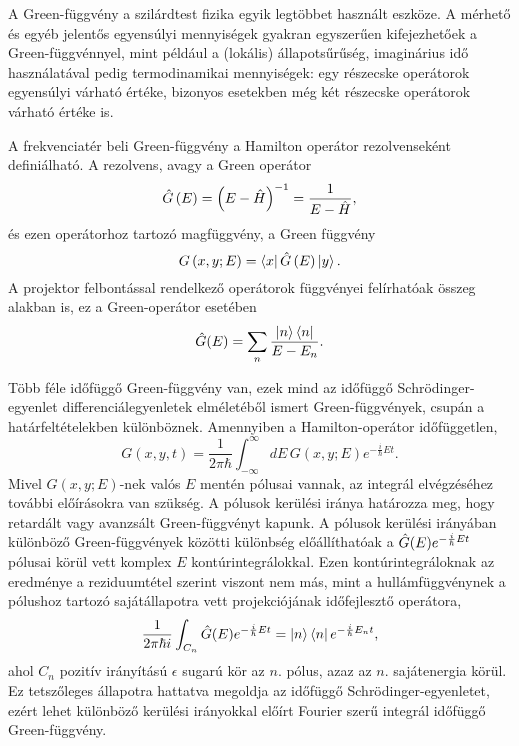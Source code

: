 A Green-függvény a szilárdtest fizika egyik legtöbbet használt eszköze. A mérhető és egyéb jelentős egyensúlyi mennyiségek gyakran egyszerűen kifejezhetőek a Green-függvénnyel, mint például a (lokális) állapotsűrűség, imaginárius idő használatával pedig termodinamikai mennyiségek: egy részecske operátorok egyensúlyi várható értéke, bizonyos esetekben még két részecske operátorok várható értéke is.

A frekvenciatér beli Green-függvény a Hamilton operátor rezolvenseként definiálható. A rezolvens, avagy a Green operátor
\begin{equation}
    \hat{G}\left( E \right) = \left(E-\hat{H}\right)^{-1} = \frac{1}{E-\hat{H}},
\end{equation}
és ezen operátorhoz tartozó magfüggvény, a Green függvény
\begin{equation}
    G\left( x, y; E \right) = \Bra{x}\hat{G}\left(E\right)\Ket{y}.
\end{equation}
A projektor felbontással rendelkező operátorok függvényei felírhatóak összeg alakban is, ez a Green-operátor esetében
\begin{equation}
	\hat{G}(E)=\sum_n \frac{\Ket{n}\Bra{n}}{E-E_n}.
\end{equation}

Több féle időfüggő Green-függvény van, ezek mind az időfüggő Schrödinger-egyenlet differenciálegyenletek elméletéből ismert Green-függvények, csupán a határfeltételekben különböznek. Amennyiben a Hamilton-operátor időfüggetlen,
\begin{equation}
	G(x, y, t) = \frac{1}{2\pi\hbar}\int_{-\infty}^{\infty}dE\,G(x,y;E)e^{-\frac{i}{\hbar}Et}.
\end{equation}
Mivel $G(x,y;E)$-nek valós $E$ mentén pólusai vannak, az integrál elvégzéséhez további előírásokra van szükség. A pólusok kerülési iránya határozza meg, hogy retardált vagy avanzsált Green-függvényt kapunk. A pólusok kerülési irányában különböző Green-függvények közötti különbség előállíthatóak a $\hat{G}(E)e^{-\frac{i}{\hbar}Et}$ pólusai körül vett komplex $E$ kontúrintegrálokkal. Ezen kontúrintegráloknak az eredménye a reziduumtétel szerint viszont nem más, mint a hullámfüggvénynek a pólushoz tartozó sajátállapotra vett projekciójának időfejlesztő operátora,
\begin{equation}
	\frac{1}{2\pi\hbar i}\int_{C_n}\hat{G}(E)e^{-\frac{i}{\hbar}Et}=\Ket{n}\Bra{n}e^{-\frac{i}{\hbar}E_nt},
	\label{green:residuum}
\end{equation}
ahol $C_n$ pozitív irányítású $\epsilon$ sugarú kör az $n$. pólus, azaz az $n$. sajátenergia körül. Ez tetszőleges állapotra hattatva megoldja az időfüggő Schrödinger-egyenletet, ezért lehet különböző kerülési irányokkal előírt Fourier szerű integrál időfüggő Green-függvény.


